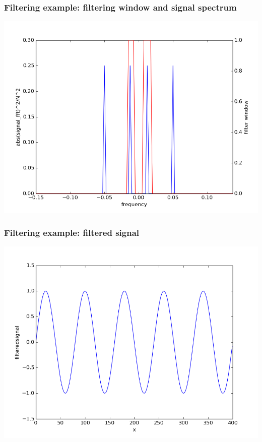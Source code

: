 \documentclass{beamer}
\begin{document}
\begin{frame}
\frametitle{Filtering example: filtering window and signal spectrum}
\includegraphics[scale=0.5]{dft_and_filterwindow.png}
\end{frame}
\begin{frame}
\frametitle{Filtering example: filtered signal}
\includegraphics[scale=0.5]{filtered_signal.png}
\end{frame}
%
%
%
\end{document}
